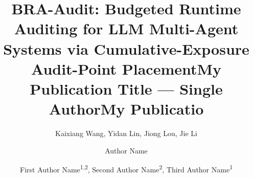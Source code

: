 \documentclass[letterpaper]{article} %
\title{BRA-Audit: Budgeted Runtime Auditing for LLM Multi-Agent Systems via Cumulative-Exposure Audit-Point Placement}
\author{
    Kaixiang Wang,
    Yidan Lin,
    Jiong Lou,
    Jie Li
}
\title{My Publication Title --- Single Author}
\author {
    Author Name
}
\title{My Publicatio}
\author {
    First Author Name\textsuperscript{\rm 1,\rm 2}\equalcontrib,
    Second Author Name\textsuperscript{\rm 2}\equalcontrib,
    Third Author Name\textsuperscript{\rm 1}\corresponding
}
\begin{document}
\maketitle

\begin{abstract}





\end{abstract}
\end{document}
